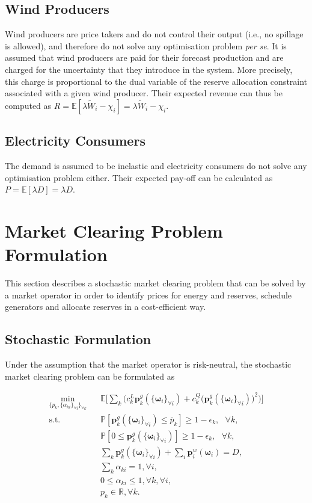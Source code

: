 \documentclass{article}
\begin{document}
\subsection{Wind Producers}

Wind producers are price takers and do not control their output (i.e., no spillage is allowed), and therefore do not solve any optimisation problem \textit{per se}. It is assumed that wind producers are paid for their forecast production and are charged for the uncertainty that they introduce in the system. More precisely, this charge is proportional to the dual variable of the reserve allocation constraint associated with a given wind producer. Their expected revenue can thus be computed as $R = \mathbb{E}[\lambda \tilde{W}_i - \chi_i] = \lambda \tilde{W}_i - \chi_i$.

\subsection{Electricity Consumers}

The demand is assumed to be inelastic and electricity consumers do not solve any optimisation problem either. Their expected pay-off can be calculated as $P = \mathbb{E}[\lambda D] = \lambda D$.

\section{Market Clearing Problem Formulation}

This section describes a stochastic market clearing problem that can be solved by a market operator in order to identify prices for energy and reserves, schedule generators and allocate reserves in a cost-efficient way. 

\subsection{Stochastic Formulation}
Under the assumption that the market operator is risk-neutral, the stochastic market clearing problem can be formulated as

\begin{align}
\underset{\{p_k, \{\alpha_{ki}\}_{\forall i}\}_{\forall k}}{\min} \hspace{10pt} & \mathbb{E}\Big[\sum_k \big(c_k^L \mathbf{p}_k^g(\{\boldsymbol{\omega}_i\}_{\forall i}) + c_k^Q \big(\mathbf{p}_k^g(\{\boldsymbol{\omega}_i\}_{\forall i})\big)^2\big)\Big]\\
\mbox{s.t. } & \mathbb{P}[\mathbf{p}_k^g(\{\boldsymbol{\omega}_i\}_{\forall i}) \le \overline{p}_k] \ge 1 - \epsilon_k, \mbox{ }\forall k,\\
& \mathbb{P}[0 \le \mathbf{p}_k^g(\{\boldsymbol{\omega}_i\}_{\forall i})] \ge 1 - \epsilon_k, \mbox{ }\forall k,\\
& \sum_k \mathbf{p}_k^g(\{\boldsymbol{\omega}_i\}_{\forall i}) + \sum_i \mathbf{p}_i^w(\boldsymbol{\omega}_i) = D,\\
& \sum_k \alpha_{ki} = 1, \forall i,\\
& 0 \le \alpha_{ki} \le 1, \forall k, \forall i,\\
& p_k \in \mathbb{R}, \forall k.
\end{align}
\end{document}
